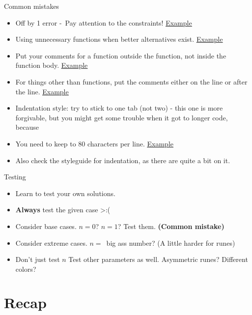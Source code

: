 \documentclass[10pt]{beamer}
\begin{document}
\begin{frame}[fragile]{Common mistakes}
  \begin{itemize}
    \item Off by 1 error -\ Pay attention to the constraints! \href{https://share.sourceacademy.nus.edu.sg/offbyone}{\underline{Example}}
    \item Using unnecessary functions when better alternatives exist. \href{https://share.sourceacademy.nus.edu.sg/rightfunctions}{\underline{Example}}
    \item Put your comments for a function outside the function, not inside the function body. \href{https://share.sourceacademy.nus.edu.sg/functioncomments}{\underline{Example}}
    \item For things other than functions, put the comments either on the line or after the line. \href{https://share.sourceacademy.nus.edu.sg/othercomments}{\underline{Example}}
    \item Indentation style: try to stick to one tab (not two) - this one is more forgivable, but you might get some trouble when it got to longer code, because
    \item You need to keep to 80 characters per line. \href{https://share.sourceacademy.nus.edu.sg/indentationonetab}{\underline{Example}}
    \item Also check the styleguide for indentation, as there are quite a bit on it. 
  \end{itemize}
\end{frame}

\begin{frame}[fragile]{Testing}
  \begin{itemize}
    \item Learn to test your own solutions.
    \item \textbf{Always} test the given case >:(
    \item Consider base cases. $n = 0$? $n = 1$? Test them. \textbf{(Common mistake)}
    \item Consider extreme cases. $n=$\ big ass number? (A little harder for runes)
    \item Don't just test $n$ Test other parameters as well. Asymmetric runes? Different colors?
  \end{itemize}
\end{frame}

\section[Recap]{Recap}
\end{document}
